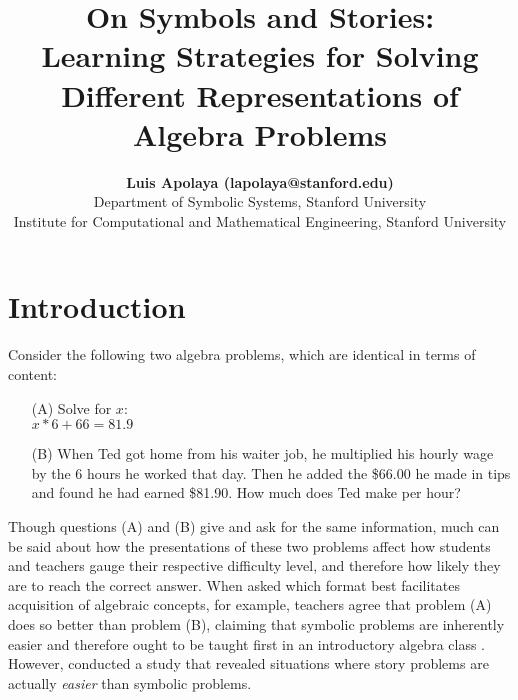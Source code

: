 \documentclass[10pt,letterpaper]{article}
\title{On Symbols and Stories:\\Learning Strategies for Solving Different Representations of Algebra Problems}
\author{{\large \bf Luis Apolaya (lapolaya@stanford.edu)} \\
  Department of Symbolic Systems, Stanford University
  \AND {\large \bf Amy Shoemaker (amyshoe@stanford.edu)} \\
  Institute for Computational and Mathematical Engineering, Stanford University}
\newcommand\TODO[1]{\textcolor{red}{#1}}
\begin{document}
\maketitle


%


\section{Introduction}


Consider the following two algebra problems, which are identical in terms of content:

\begin{enumerate}
\item[(A)] Solve for $x$:\\ $x * 6 + 66 = 81.9$

\item[(B)] When Ted got home from his waiter job, he multiplied his hourly wage by the 6 hours he worked that day. Then he added the \$66.00 he made in tips and found he had earned \$81.90. How much does Ted make per hour?
\end{enumerate}

Though questions (A) and (B) give and ask for the same information, much can be said about how the presentations of these two problems affect how students and teachers gauge their respective difficulty level, and therefore how likely they are to reach the correct answer. When asked which format best facilitates acquisition of algebraic concepts, for example, teachers agree that problem (A) does so better than problem (B), claiming that symbolic problems are inherently easier and therefore ought to be taught first in an introductory algebra class \cite{KoedNath2004,Nathan2012}. However,  conducted a study that revealed situations where story problems are actually \textit{easier} than symbolic problems. 
\end{document}

